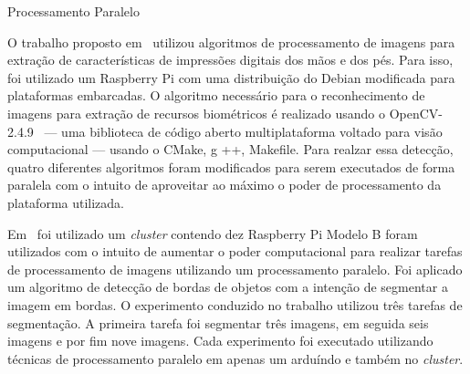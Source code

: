 \begin{subsection}{Processamento Paralelo}

O trabalho proposto em~\cite{Sivaranjani15} utilizou algoritmos de processamento de
imagens para extração de características de impressões digitais dos mãos e dos
pés. Para isso, foi utilizado um Raspberry Pi com uma distribuição do Debian
modificada para plataformas embarcadas. O algoritmo necessário para o
reconhecimento de imagens para extração de recursos biométricos é realizado
usando o OpenCV-2.4.9~\cite{opencv} --- uma biblioteca de código aberto multiplataforma
voltado para visão computacional --- usando o CMake, g ++,
Makefile. Para realzar essa detecção, quatro diferentes algoritmos foram
modificados para serem executados de forma paralela com o intuito de aproveitar
ao máximo o poder de processamento da plataforma utilizada.


Em~\cite{Markovic18} foi utilizado um \textit{cluster} contendo dez Raspberry
Pi Modelo B foram utilizados com o intuito de aumentar o poder computacional
para realizar tarefas de processamento de imagens utilizando um processamento
paralelo. Foi aplicado um algoritmo de detecção de bordas de objetos com a
intenção de segmentar a imagem em bordas. O experimento conduzido no trabalho
utilizou três tarefas de segmentação. A primeira tarefa foi segmentar três
imagens, em seguida seis imagens e por fim nove imagens. Cada experimento foi
executado utilizando técnicas de processamento paralelo em apenas um arduíndo e
também no \textit{cluster}. 


\end{subsection}
